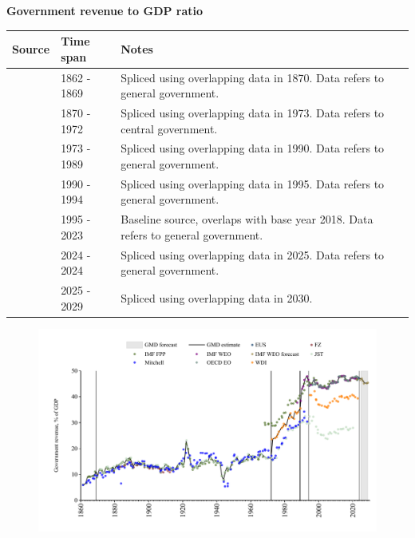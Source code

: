 \documentclass[12pt,a4paper,landscape]{article}
\begin{document}
\begin{adjustbox}{max totalsize={\paperwidth}{\paperheight},center}
\begin{minipage}[t][\textheight][t]{\textwidth}
\vspace*{0.5cm}
{}
\begin{center}
{\Large\bfseries Government revenue to GDP ratio}
\end{center}
\vspace{0.5cm}
\begin{table}[H]
\centering
\small
\begin{tabular}{|l|l|l|}
\hline
\textbf{Source} & \textbf{Time span} & \textbf{Notes} \\
\hline
\rowcolor{white}\cite{IMF_FPP}& 1862 - 1869 &Spliced using overlapping data in 1870. Data refers to general government.\\
\rowcolor{lightgray}\cite{JST}& 1870 - 1972 &Spliced using overlapping data in 1973. Data refers to central government.\\
\rowcolor{white}\cite{WDI}& 1973 - 1989 &Spliced using overlapping data in 1990. Data refers to general government.\\
\rowcolor{lightgray}\cite{IMF_WEO}& 1990 - 1994 &Spliced using overlapping data in 1995. Data refers to general government.\\
\rowcolor{white}\cite{OECD_EO}& 1995 - 2023 &Baseline source, overlaps with base year 2018. Data refers to general government.\\
\rowcolor{lightgray}\cite{EUS}& 2024 - 2024 &Spliced using overlapping data in 2025. Data refers to general government.\\
\rowcolor{white}\cite{IMF_WEO_forecast}& 2025 - 2029 &Spliced using overlapping data in 2030. \\
\hline
\end{tabular}
\end{table}
\begin{figure}[H]
\centering
\includegraphics[width=\textwidth,height=0.6\textheight,keepaspectratio]{graphs/ITA_govrev_GDP.pdf}
\end{figure}
\end{minipage}
\end{adjustbox}
\end{document}
